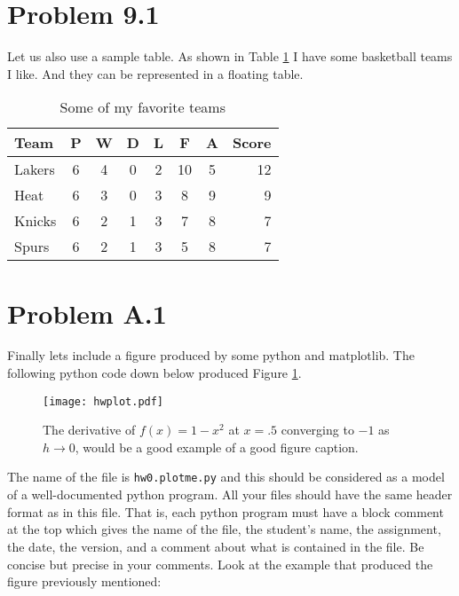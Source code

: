 \documentclass[a4paper]{article}
\begin{document}
\section{Problem 9.1}
Let us also use a sample table. As shown in Table \ref{tbl:aTable} I have some
basketball teams I like. And they can be represented in a floating table.

\begin{table}[h]
 \caption{Some of my favorite teams}
 \label{tbl:aTable}
 \begin{center}
  \begin{tabular}{lccccccr}
    \hline \hline
    Team   & P & W & D & L & F  & A & Score \\
    \hline
    Lakers & 6 & 4 & 0 & 2 & 10 & 5 & 12  \\
    Heat   & 6 & 3 & 0 & 3 &  8 & 9 &  9  \\
    Knicks & 6 & 2 & 1 & 3 &  7 & 8 &  7  \\
    Spurs  & 6 & 2 & 1 & 3 &  5 & 8 &  7  \\
    \hline \hline
  \end{tabular}
 \end{center}
\end{table}

\section{Problem A.1}
Finally lets include a figure produced by some python and matplotlib. The
following python code down below produced Figure \ref{fig:plot}. 

\begin{figure}[h]
  \begin{center}
    \texttt{[image: hwplot.pdf]}
  \end{center}
  \caption{The derivative of $f(x)=1-x^2$ at $x=.5$ converging to $-1$ as
  $h\to0$, would be a good example of a good figure caption.}
  \label{fig:plot}
\end{figure}

The name of the file is {\tt hw0.plotme.py} and this should be considered as a
model of a well-documented python program. All your files should have the same
header format as in this file. That is, each python program must have a block
comment at the top which gives the name of the file, the student's name, the
assignment, the date, the version, and a comment about what is contained in the
file. Be concise but precise in your comments. Look at the example that
produced the figure previously mentioned:
\end{document}
